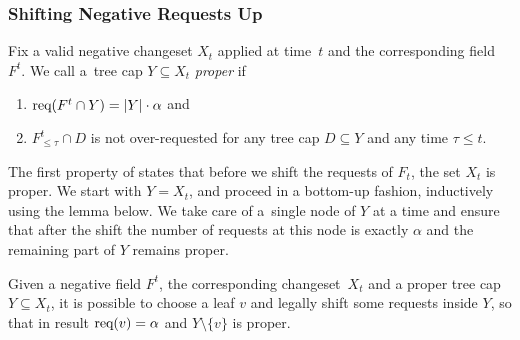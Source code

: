 


\subsubsection{Shifting Negative Requests Up}
\label{sec:negative_shifting}
  
Fix a valid negative changeset $X_t$ applied at time~$t$ and the
corresponding field~$F^t$. We call a~tree cap \mbox{$Y \subseteq X_t$} \emph{proper} if
\begin{enumerate}
\item $\textrm{req}(F^t \cap Y) = |Y| \cdot \alpha$ and
\item $F^t_{\leq \tau} \cap D$ is not over-requested for any tree cap $D \subseteq Y$ and any time 
$\tau \leq t$.
\end{enumerate}

The first property of  states that before
we shift the requests of $F_t$, the set $X_t$ is proper.  We start with $Y =
X_t$, and proceed in a bottom-up fashion, inductively using the lemma below.
We take care of a~single node of $Y$ at a time and ensure that after the shift
the number of requests at this node is exactly $\alpha$ and the remaining part
of $Y$ remains proper.

\begin{lemma}
\label{lem:shift_up_and_stay_proper}
Given a negative field $F^t$, the corresponding changeset~$X_t$ and 
a proper tree cap $Y \subseteq X_t$, it is possible to choose a leaf $v$ 
and legally shift some requests inside $Y$,
so that in result $\textrm{req}({v}) = \alpha$ and $Y \setminus \{v\}$ is proper.
\end{lemma}

